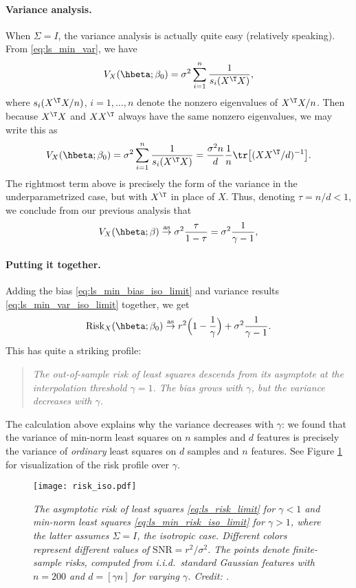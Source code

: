 \documentclass{article}
\begin{document}
\paragraph{Variance analysis.}

When $\Sigma = I$, the variance analysis is actually quite easy (relatively
speaking). From \eqref{eq:ls_min_var}, we have
\[
V_X(\hbeta; \beta_0) = \sigma^2 \sum_{i=1}^n \frac{1}{s_i(X^\T X)},
\]
where $s_i(X^\T X/n)$, $i=1,\dots,n$ denote the nonzero eigenvalues of $X^\T  
X/n$. Then because $X^\T X$ and $XX^\T$ always have the same nonzero
eigenvalues, we may write this as
\[
V_X(\hbeta; \beta_0) = \sigma^2 \sum_{i=1}^n \frac{1}{s_i(X^\T X)} = 
\frac{\sigma^2 n}{d} \frac{1}{n} \tr\big[ (XX^\T /d)^{-1} \big].
\]
The rightmost term above is precisely the form of the variance in the
underparametrized case, but with $X^\T$ in place of $X$. Thus, denoting $\tau =
n/d < 1$, we conclude from our previous analysis that  
\begin{equation}
\label{eq:ls_min_var_iso_limit}
V_X(\hbeta; \beta) \asto \sigma^2 \frac{\tau}{1-\tau} = \sigma^2 
\frac{1}{\gamma-1},  
\end{equation}

\paragraph{Putting it together.}

Adding the bias \eqref{eq:ls_min_bias_iso_limit} and variance results
\eqref{eq:ls_min_var_iso_limit} together, we get
\begin{equation}
\label{eq:ls_min_risk_iso_limit}
\Risk_X(\hbeta; \beta_0) \asto r^2 \Big( 1- \frac{1}{\gamma} \Big) + \sigma^2 
\frac{1}{\gamma-1}. 
\end{equation}
This has quite a striking profile:
\begin{quote}
\centering\it
The out-of-sample risk of least squares descends from its asymptote at the
interpolation threshold $\gamma = 1$. The bias grows with $\gamma$, but 
the variance decreases with $\gamma$.      
\end{quote}
The calculation above explains why the variance decreases with $\gamma$: we
found that the variance of min-norm least squares on $n$ samples and $d$
features is precisely the variance of \emph{ordinary} least squares on $d$
samples and $n$ features. See Figure \ref{fig:risk_iso} for visualization of the
risk profile over $\gamma$.

\begin{figure}[htb]
\centering
\texttt{[image: risk\_iso.pdf]}
\caption{\it The asymptotic risk of least squares \eqref{eq:ls_risk_limit} for
  $\gamma<1$ and min-norm least squares \eqref{eq:ls_min_risk_iso_limit} for
  $\gamma>1$, where the latter assumes $\Sigma = I$, the isotropic
  case. Different colors represent different values of $\mathrm{SNR} = r^2 /
  \sigma^2$. The points denote finite-sample risks, computed from i.i.d.\
  standard Gaussian features with $n=200$ and $d=[\gamma n]$ for varying
  $\gamma$. Credit: \citet{hastie2022surprises}.}  
\label{fig:risk_iso}
\end{figure}
\end{document}
